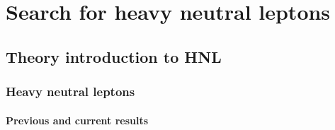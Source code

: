 \part {Search for heavy neutral leptons}

\chapter{Theory introduction to HNL} %

\label{Chapter3} %

\section{Heavy neutral leptons}
\subsection{Previous and current results}

